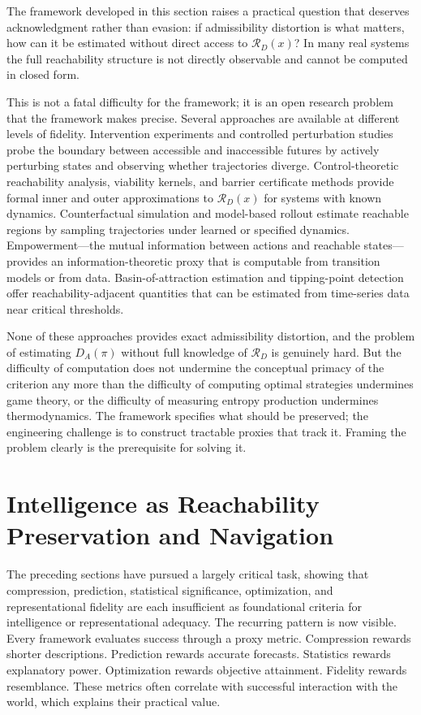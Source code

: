 \documentclass[12pt,a4paper]{article}
\theoremstyle{plain}
\theoremstyle{definition}
\theoremstyle{remark}
\begin{document}
The framework developed in this section raises a practical question that
deserves acknowledgment rather than evasion: if admissibility distortion is
what matters, how can it be estimated without direct access to
$\mathcal{R}_D(x)$? In many real systems the full reachability structure is
not directly observable and cannot be computed in closed form.

This is not a fatal difficulty for the framework; it is an open research
problem that the framework makes precise. Several approaches are available
at different levels of fidelity. Intervention experiments and controlled
perturbation studies probe the boundary between accessible and inaccessible
futures by actively perturbing states and observing whether trajectories
diverge. Control-theoretic reachability analysis, viability kernels, and
barrier certificate methods provide formal inner and outer approximations to
$\mathcal{R}_D(x)$ for systems with known dynamics. Counterfactual simulation
and model-based rollout estimate reachable regions by sampling trajectories
under learned or specified dynamics. Empowerment---the mutual information
between actions and reachable states---provides an information-theoretic
proxy that is computable from transition models or from data. Basin-of-attraction
estimation and tipping-point detection offer reachability-adjacent quantities
that can be estimated from time-series data near critical thresholds.

None of these approaches provides exact admissibility distortion, and the
problem of estimating $D_A(\pi)$ without full knowledge of $\mathcal{R}_D$
is genuinely hard. But the difficulty of computation does not undermine the
conceptual primacy of the criterion any more than the difficulty of computing
optimal strategies undermines game theory, or the difficulty of measuring
entropy production undermines thermodynamics. The framework specifies what
should be preserved; the engineering challenge is to construct tractable
proxies that track it. Framing the problem clearly is the prerequisite for
solving it.

\section{Intelligence as Reachability Preservation and Navigation}

The preceding sections have pursued a largely critical task, showing that
compression, prediction, statistical significance, optimization, and
representational fidelity are each insufficient as foundational criteria for
intelligence or representational adequacy. The recurring pattern is now
visible. Every framework evaluates success through a proxy metric.
Compression rewards shorter descriptions. Prediction rewards accurate
forecasts. Statistics rewards explanatory power. Optimization rewards
objective attainment. Fidelity rewards resemblance. These metrics often
correlate with successful interaction with the world, which explains their
practical value.
\end{document}
